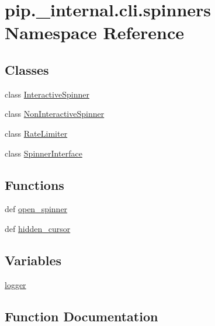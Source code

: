 \hypertarget{namespacepip_1_1__internal_1_1cli_1_1spinners}{}\section{pip.\+\_\+internal.\+cli.\+spinners Namespace Reference}
\label{namespacepip_1_1__internal_1_1cli_1_1spinners}
\subsection*{Classes}
\begin{DoxyCompactItemize}
\item 
class \hyperlink{classpip_1_1__internal_1_1cli_1_1spinners_1_1InteractiveSpinner}{Interactive\+Spinner}
\item 
class \hyperlink{classpip_1_1__internal_1_1cli_1_1spinners_1_1NonInteractiveSpinner}{Non\+Interactive\+Spinner}
\item 
class \hyperlink{classpip_1_1__internal_1_1cli_1_1spinners_1_1RateLimiter}{Rate\+Limiter}
\item 
class \hyperlink{classpip_1_1__internal_1_1cli_1_1spinners_1_1SpinnerInterface}{Spinner\+Interface}
\end{DoxyCompactItemize}
\subsection*{Functions}
\begin{DoxyCompactItemize}
\item 
def \hyperlink{namespacepip_1_1__internal_1_1cli_1_1spinners_a2d2a677634dbb5a5c1e7f5adde2e69c8}{open\+\_\+spinner}
\item 
def \hyperlink{namespacepip_1_1__internal_1_1cli_1_1spinners_afbcf0bfa67e166e660028319f5d31cdd}{hidden\+\_\+cursor}
\end{DoxyCompactItemize}
\subsection*{Variables}
\begin{DoxyCompactItemize}
\item 
\hyperlink{namespacepip_1_1__internal_1_1cli_1_1spinners_a71c58270383de5c2e8fde038636287d0}{logger}
\end{DoxyCompactItemize}


\subsection{Function Documentation}
\mbox{\label{namespacepip_1_1__internal_1_1cli_1_1spinners_afbcf0bfa67e166e660028319f5d31cdd}} 
